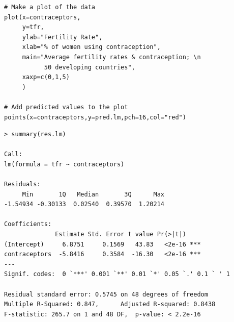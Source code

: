 \documentclass[pdflatex,landscape,titlepage]{foils}
\begin{document}
\begin{verbatim}
# Make a plot of the data
plot(x=contraceptors,
     y=tfr,
     ylab="Fertility Rate",
     xlab="% of women using contraception",
     main="Average fertility rates & contraception; \n
           50 developing countries",
     xaxp=c(0,1,5)
     )

# Add predicted values to the plot
points(x=contraceptors,y=pred.lm,pch=16,col="red") 
\end{verbatim}

\bgclear

\begin{verbatim}
> summary(res.lm)

Call:
lm(formula = tfr ~ contraceptors)

Residuals:
     Min       1Q   Median       3Q      Max 
-1.54934 -0.30133  0.02540  0.39570  1.20214 

Coefficients:
              Estimate Std. Error t value Pr(>|t|)    
(Intercept)     6.8751     0.1569   43.83   <2e-16 ***
contraceptors  -5.8416     0.3584  -16.30   <2e-16 ***
---
Signif. codes:  0 `***' 0.001 `**' 0.01 `*' 0.05 `.' 0.1 ` ' 1 

Residual standard error: 0.5745 on 48 degrees of freedom
Multiple R-Squared: 0.847,      Adjusted R-squared: 0.8438 
F-statistic: 265.7 on 1 and 48 DF,  p-value: < 2.2e-16 
\end{verbatim}

\bgclear
{}
\end{document}
